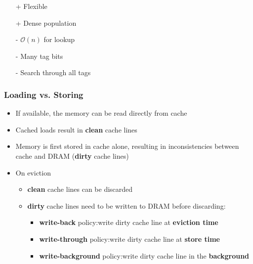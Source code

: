 \newpar{}
\begin{itemize}
    \item[+] Flexible
    \item[+] Dense population
    \item[-] $\mathcal{O}(n)$ for lookup
    \item[-] Many tag bits
    \item[-] Search through all tags
\end{itemize}

\subsubsection{Loading vs. Storing}
\begin{itemize}
    \item If available, the memory can be read directly from cache
    \item Cached loads result in \textbf{clean} cache lines
\end{itemize}

\newpar{}
\begin{itemize}
    \item Memory is first stored in cache alone, resulting in inconsistencies between cache and DRAM (\textbf{dirty} cache lines)
    \item On eviction
          \begin{itemize}
              \item \textbf{clean} cache lines can be discarded
              \item \textbf{dirty} cache lines need to be written to DRAM before discarding:
                    \begin{itemize}
                        \item \textbf{write-back} policy:\newline write dirty cache line at \textbf{eviction time}
                        \item \textbf{write-through} policy:\newline write dirty cache line at \textbf{store time}
                        \item \textbf{write-background} policy:\newline write dirty cache line in the \textbf{background}
                    \end{itemize}
          \end{itemize}
\end{itemize}